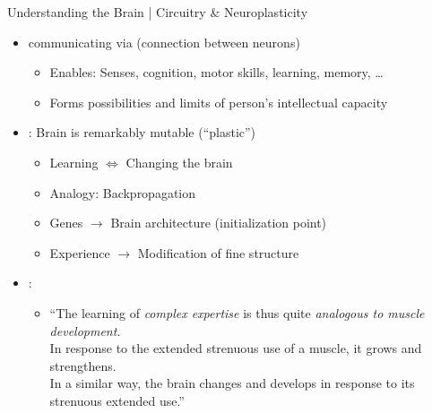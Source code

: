 \documentclass{ercisbeamer}
\begin{document}
\begin{frame}{Understanding the Brain | Circuitry \& Neuroplasticity}
    \begin{tbox}
        \begin{itemize}
            \item {} communicating via  (connection between neurons)
            \begin{itemize}
                \item Enables: Senses, cognition, motor skills, learning, memory, …
                \item Forms possibilities and limits of person's intellectual capacity
            \end{itemize}
            \item {}: Brain is remarkably mutable (``plastic'')
            \begin{itemize}
                \item Learning $\Leftrightarrow$ Changing the brain
                \item Analogy: Backpropagation 
                \item Genes $\rightarrow$ Brain architecture (initialization point)
                \item Experience $\rightarrow$ Modification of fine structure
            \end{itemize}
        \end{itemize}
    \end{tbox}

    \begin{tbox}
        \begin{itemize}
            \item \citet{wieman12}: 
            \begin{itemize}
                \item ``The learning of \emph{complex expertise} is thus quite \emph{analogous to muscle development}. \\
                In response to the extended strenuous use of a muscle, it grows and strengthens. \\
                In a similar way, the brain changes and develops in response to its strenuous extended use.''
            \end{itemize}
        \end{itemize}
    \end{tbox}


\end{frame}
\end{document}
